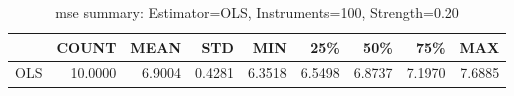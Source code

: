 \begin{table}[ht]
\centering
\caption{mse summary: Estimator=OLS, Instruments=100, Strength=0.20}
\begin{tabular}{lrrrrrrrr}
\toprule
 & COUNT & MEAN & STD & MIN & 25\% & 50\% & 75\% & MAX \\
\midrule
OLS & 10.0000 & 6.9004 & 0.4281 & 6.3518 & 6.5498 & 6.8737 & 7.1970 & 7.6885 \\
\bottomrule
\end{tabular}
\end{table}
